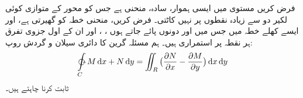 
 فرض کریں مستوی  میں     ایسی ہموار، سادہ، منحنی  ہے جس کو محور کے متوازی   کوئی   لکیر دو  سے زیادہ نقطوں پر  نہیں کاٹتی۔  فرض کریں، منحنی    خطہ       کو گھیرتی    ہے، اور ایسے کھلے  خطہ میں جس میں   اور   دونوں  پائے جاتے ہوں ، ،   اور ان کے اول جزوی تفرق  ہر نقطہ پر استمراری ہیں۔ ہم مسئلہ گرین کا دائری  سیلان و  گردش روپ:
\begin{align}\label{مساوات_سمتی_تکمل_خصوصی_پر_ثبوت}
\ointctrclockwise\limits_C M \dif x + N \dif y = \iint_R \big(\frac{\partial N}{\partial x} - \frac{\partial M}{\partial y}\big) \dif x \dif y 
\end{align}
 ثابت کرنا چاہتے  ہیں۔     


